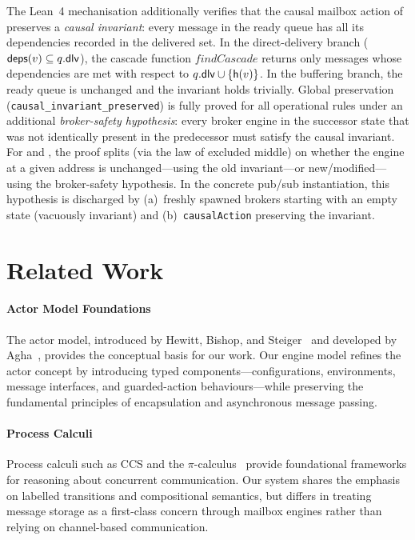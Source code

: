 \documentclass[
  a4paper,        %
  techreport,     %
]{art}
\begin{document}
\begin{remark}\label{rem:causal-invariant}%
  The Lean~4 mechanisation additionally verifies that the causal mailbox
  action of  preserves a \emph{causal invariant}:
  every message in the ready queue has all its dependencies recorded in the
  delivered set. In the direct-delivery branch ($\mathsf{deps}(v) \subseteq
  q.\mathsf{dlv}$), the cascade function $\mathit{findCascade}$ returns only
  messages whose dependencies are met with respect to
  $q.\mathsf{dlv} \cup \{\mathsf{h}(v)\}$. In the buffering branch, the ready queue
  is unchanged and the invariant holds trivially.
  Global preservation (\texttt{causal\_invariant\_preserved}) is fully
  proved for all operational rules under an additional
  \emph{broker-safety hypothesis}: every broker engine in the successor
  state that was not identically present in the predecessor must satisfy
  the causal invariant. For  and
  , the proof splits (via the law of excluded middle) on
  whether the engine at a given address is unchanged---using the old
  invariant---or new/modified---using the broker-safety hypothesis. In the
  concrete pub/sub instantiation, this hypothesis is discharged by
  (a)~freshly spawned brokers starting with an empty state (vacuously
  invariant) and (b)~\texttt{causalAction} preserving the invariant.
\end{remark}

\section{Related Work}\label{sec:related-work}

\paragraph{Actor Model Foundations}
The actor model, introduced by Hewitt, Bishop, and
Steiger~\cite{Hewitt1973} and developed by Agha~\cite{Agha1986,foundation97agha},
provides the conceptual basis for our work. Our engine model refines the actor
concept by introducing typed components---configurations, environments, message
interfaces, and guarded-action behaviours---while preserving the fundamental
principles of encapsulation and asynchronous message passing.

\paragraph{Process Calculi}
Process calculi such as CCS and the $\pi$-calculus~\cite{milner-concurrency}
provide foundational frameworks for reasoning about concurrent communication.
Our system shares the emphasis on labelled transitions and compositional
semantics, but differs in treating message storage as a first-class concern
through mailbox engines rather than relying on channel-based communication.
\end{document}
